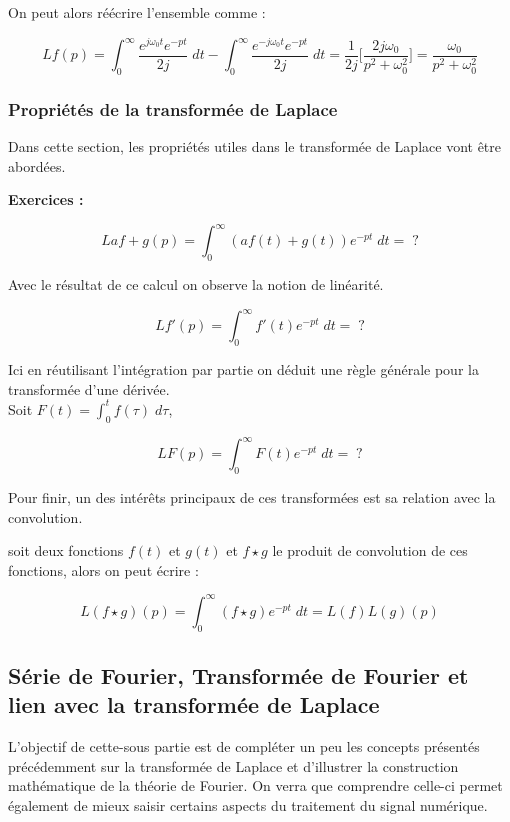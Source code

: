 \documentclass[11pt,a4paper]{article}
\begin{document}
On peut alors réécrire l'ensemble comme :

\[L{f}(p) =  \int^{\infty}_{0} \frac{e^{j \omega_0 t}e^{-pt}}{2j}  \; dt - \int^{\infty}_{0} \frac{e^{-j \omega_0 t}e^{-pt}}{2j}  \; dt = \frac{1}{2j}\Big[\frac{2j\omega_0}{p^2 + \omega_0^2}  \Big] = \frac{\omega_0}{p^2 + \omega_0^2} \]

\subsubsection{Propriétés de la transformée de Laplace}
Dans cette section, les propriétés utiles dans le transformée de Laplace vont être abordées.

\textbf{Exercices : } 

\[L{af+g}(p) = \int^{\infty}_{0}( a f(t) + g(t)) e^{-pt} \; dt = \; ?\]

Avec le résultat de ce calcul on observe la notion de linéarité.

\[L{f'}(p) = \int^{\infty}_{0}f'(t) e^{-pt} \; dt = \; ?\]

Ici en réutilisant l'intégration par partie on déduit une règle générale pour la transformée d'une dérivée.\\

Soit $F(t) = \int^{t}_{0} f(\tau)  \; d\tau$,

\[L{F}(p) = \int^{\infty}_{0}F(t) e^{-pt} \; dt = \; ?\]

Pour finir, un des intérêts principaux de ces transformées est sa relation avec la convolution.

soit deux fonctions $f(t)$ et $g(t)$ et $f \star g$ le produit de convolution de ces fonctions, alors on peut écrire :

\[L (f \star g) (p) =  \int^{\infty}_{0}(f \star g) e^{-pt} \; dt = L(f)L(g) (p)  \]



\subsection{Série de Fourier, Transformée de Fourier et lien avec la transformée de Laplace}
L'objectif de cette-sous partie est de compléter un peu les concepts présentés précédemment sur la transformée de Laplace et d'illustrer la construction mathématique de la théorie de Fourier. On verra que comprendre celle-ci permet également de mieux saisir certains aspects du traitement du signal numérique.
\end{document}

